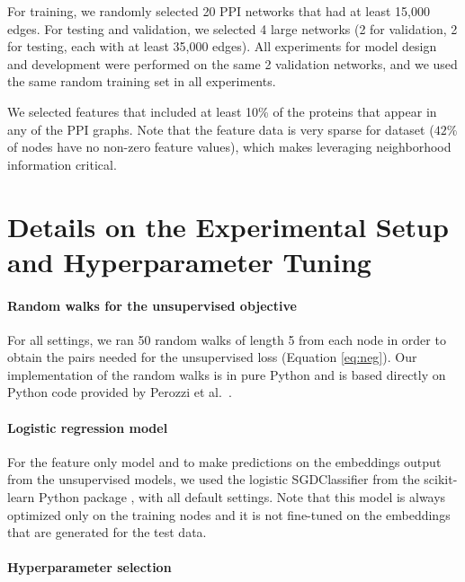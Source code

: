 For training, we randomly selected 20 PPI networks that had at least 15,000 edges. For testing and validation, we selected 4 large networks (2 for validation, 2 for testing, each with at least 35,000 edges). All experiments for model design and development were performed on the same 2 validation networks, and we used the same random training set in all experiments.

We selected features that included at least 10\% of the proteins that appear in any of the PPI graphs. 
Note that the feature data is very sparse for dataset ($42\%$ of nodes have no non-zero feature values), which makes leveraging neighborhood information critical. 

\section{Details on the Experimental Setup and Hyperparameter Tuning}\label{inductive:sec:hyper}

\paragraph{Random walks for the unsupervised objective}
For all settings, we ran 50 random walks of length 5 from each node in order to obtain the pairs needed for the unsupervised loss (Equation \ref{eq:neg}).
Our implementation of the random walks is in pure Python and is based directly on Python code provided by Perozzi et al.~\cite{perozzi2014deepwalk}.

\paragraph{Logistic regression model}
For the feature only model and to make predictions on the embeddings output from the unsupervised models, 
we used the logistic SGDClassifier from the scikit-learn Python package \cite{scikit-learn}, with all default settings.
Note that this model is always optimized only on the training nodes and it is not fine-tuned on the embeddings that are generated for the test data.


\paragraph{Hyperparameter selection}

